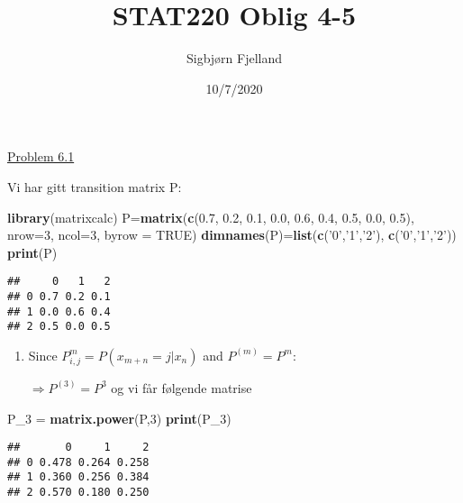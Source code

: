 \documentclass[]{article}
\title{STAT220 Oblig 4-5}
\author{Sigbjørn Fjelland}
\date{10/7/2020}
\newenvironment{Shaded}{\begin{snugshade}}{\end{snugshade}}
\newcommand{\DataTypeTok}[1]{\textcolor[rgb]{0.13,0.29,0.53}{#1}}
\newcommand{\DecValTok}[1]{\textcolor[rgb]{0.00,0.00,0.81}{#1}}
\newcommand{\FloatTok}[1]{\textcolor[rgb]{0.00,0.00,0.81}{#1}}
\newcommand{\KeywordTok}[1]{\textcolor[rgb]{0.13,0.29,0.53}{\textbf{#1}}}
\newcommand{\NormalTok}[1]{#1}
\newcommand{\OtherTok}[1]{\textcolor[rgb]{0.56,0.35,0.01}{#1}}
\newcommand{\StringTok}[1]{\textcolor[rgb]{0.31,0.60,0.02}{#1}}
\begin{document}
\maketitle

\underline{Problem 6.1}

Vi har gitt transition matrix P:

\begin{Shaded}
\begin{Highlighting}[]
\KeywordTok{library}\NormalTok{(matrixcalc)}
\NormalTok{P=}\KeywordTok{matrix}\NormalTok{(}\KeywordTok{c}\NormalTok{(}\FloatTok{0.7}\NormalTok{, }\FloatTok{0.2}\NormalTok{, }\FloatTok{0.1}\NormalTok{, }\FloatTok{0.0}\NormalTok{, }\FloatTok{0.6}\NormalTok{, }\FloatTok{0.4}\NormalTok{, }\FloatTok{0.5}\NormalTok{, }\FloatTok{0.0}\NormalTok{, }\FloatTok{0.5}\NormalTok{), }\DataTypeTok{nrow=}\DecValTok{3}\NormalTok{, }\DataTypeTok{ncol=}\DecValTok{3}\NormalTok{, }\DataTypeTok{byrow =} \OtherTok{TRUE}\NormalTok{)}
\KeywordTok{dimnames}\NormalTok{(P)=}\KeywordTok{list}\NormalTok{(}\KeywordTok{c}\NormalTok{(}\StringTok{'0'}\NormalTok{,}\StringTok{'1'}\NormalTok{,}\StringTok{'2'}\NormalTok{), }\KeywordTok{c}\NormalTok{(}\StringTok{'0'}\NormalTok{,}\StringTok{'1'}\NormalTok{,}\StringTok{'2'}\NormalTok{))}
\KeywordTok{print}\NormalTok{(P)}
\end{Highlighting}
\end{Shaded}

\begin{verbatim}
##     0   1   2
## 0 0.7 0.2 0.1
## 1 0.0 0.6 0.4
## 2 0.5 0.0 0.5
\end{verbatim}

\begin{enumerate}
\def\labelenumi{\alph{enumi})}
\item
  Since \(P_{i,j}^{m} = P(x_{m+n}=j|x_{n})\) and \(P^{(m)}=P^{m}\):

  \(\Rightarrow{P^{(3)}=P^{3}}\) og vi får følgende matrise
\end{enumerate}

\begin{Shaded}
\begin{Highlighting}[]
\NormalTok{P_}\DecValTok{3}\NormalTok{ =}\StringTok{ }\KeywordTok{matrix.power}\NormalTok{(P,}\DecValTok{3}\NormalTok{)}
\KeywordTok{print}\NormalTok{(P_}\DecValTok{3}\NormalTok{)}
\end{Highlighting}
\end{Shaded}

\begin{verbatim}
##       0     1     2
## 0 0.478 0.264 0.258
## 1 0.360 0.256 0.384
## 2 0.570 0.180 0.250
\end{verbatim}
\end{document}
